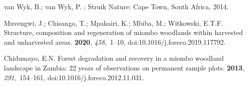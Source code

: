 \documentclass[diversity,article,accept,moreauthors,pdftex]{Definitions/mdpi}
\begin{document}
\begin{thebibliography}{999}
{van Wyk}, B.; {van Wyk}, P.
; Struik Nature: Cape
  Town, South Africa,  2014.

Muvengwi, J.; Chisango, T.; Mpakairi, K.; Mbiba, M.; Witkowski, E.T.F.
\newblock Structure, composition and regeneration of miombo woodlands within
  harvested and unharvested areas.
 {\bf 2020}, {\em 458},~1--10, doi:10.1016/j.foreco.2019.117792.

Chidumayo, E.N.
\newblock Forest degradation and recovery in a miombo woodland landscape in
  {Zambia}: 22 years of observations on permanent sample plots.
 {\bf 2013}, {\em 291},~154--161, doi:10.1016/j.foreco.2012.11.031.

\end{thebibliography}


\end{document}

